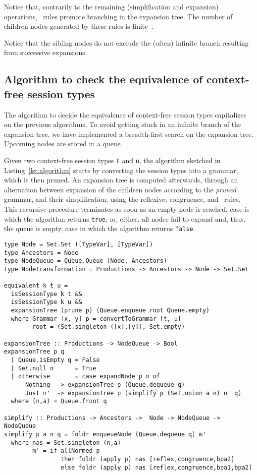 Notice that, contrarily to the remaining (simplification and expansion) operations, 
\BPA\ rules promote branching in the expansion tree. The number of children nodes 
generated by these rules is finite~\cite{DBLP:journals/iandc/ChristensenHS95}.

Notice that the sibling nodes do not exclude the (often) infinite branch 
resulting from successive expansions.

\subsection{Algorithm to check the equivalence of context-free session types}

The algorithm to decide the equivalence of context-free session 
types capitalizes on the previous algorithms. To avoid getting stuck in an 
infinite branch of the expansion tree, we have implemented 
a breadth-first search on the expansion tree. Upcoming nodes are stored
in a queue.

Given two context-free session types \lstinline|t| and \lstinline|u|,
the algorithm sketched in Listing~\ref{lst:algorithm} starts by converting 
the session types into a grammar, which is then pruned. An expansion tree is
computed afterwards, through an alternation between expansion of the children
nodes according to the \emph{pruned} grammar, and their simplification, 
using the reflexive, congruence, and \BPA\ rules. This recursive procedure
terminates as soon as an empty node is reached, case is which the
algorithm returns \lstinline|true|, or, either, all nodes fail to expand
and, thus, the queue is empty, case in which the algorithm returns
\lstinline|false|. 

\begin{lstlisting}[caption={Algorithm to check the equivalence of context-free session types. Haskell code.},label={lst:algorithm},captionpos=b]
type Node = Set.Set ([TypeVar], [TypeVar])
type Ancestors = Node
type NodeQueue = Queue.Queue (Node, Ancestors)
type NodeTransformation = Productions -> Ancestors -> Node -> Set.Set 

equivalent k t u =
  isSessionType k t &&
  isSessionType k u &&
  expansionTree (prune p) (Queue.enqueue root Queue.empty)
  where Grammar [x, y] p = convertToGrammar [t, u]
        root = (Set.singleton ([x],[y]), Set.empty)

expansionTree :: Productions -> NodeQueue -> Bool
expansionTree p q
  | Queue.isEmpty q = False
  | Set.null n      = True
  | otherwise       = case expandNode p n of
      Nothing  -> expansionTree p (Queue.dequeue q)
      Just n'  -> expansionTree p (simplify p (Set.union a n) n' q)
  where (n,a) = Queue.front q

simplify :: Productions -> Ancestors ->  Node -> NodeQueue -> NodeQueue
simplify p a n q = foldr enqueueNode (Queue.dequeue q) m'
  where nas = Set.singleton (n,a)
        m' = if allNormed p 
                then foldr (apply p) nas [reflex,congruence,bpa2]
                else foldr (apply p) nas [reflex,congruence,bpa1,bpa2]
\end{lstlisting}

